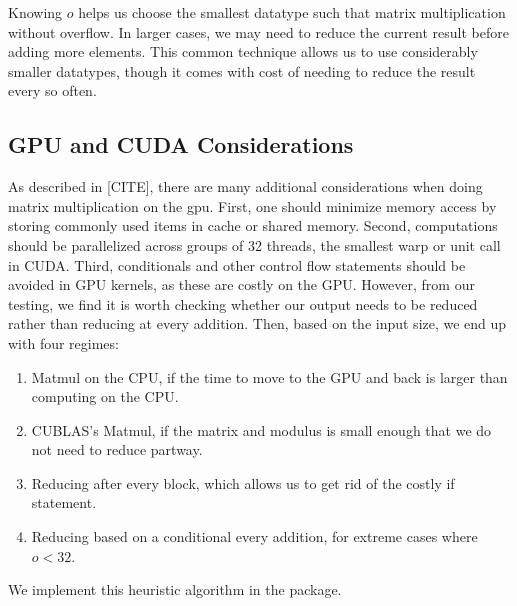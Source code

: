 Knowing $o$ helps us choose the smallest datatype such that matrix multiplication without overflow. In larger cases, we may need to reduce the current result before adding more elements. This common technique allows us to use considerably smaller datatypes, though it comes with cost of needing to reduce the result every so often.

\subsection{GPU and CUDA Considerations}

As described in [CITE], there are many additional considerations when doing matrix multiplication on the gpu. First, one should minimize memory access by storing commonly used items in cache or shared memory. Second, computations should be parallelized across groups of 32 threads, the smallest warp or unit call in CUDA. Third, conditionals and other control flow statements should be avoided in GPU kernels, as these are costly on the GPU. However, from our testing, we find it is worth checking whether our output needs to be reduced rather than reducing at every addition. Then, based on the input size, we end up with four regimes:
\begin{enumerate}
    \item Matmul on the CPU, if the time to move to the GPU and back is larger than computing on the CPU.
    \item CUBLAS's Matmul, if the matrix and modulus is small enough that we do not need to reduce partway.
    \item Reducing after every block, which allows us to get rid of the costly if statement.
    \item Reducing based on a conditional every addition, for extreme cases where $o < 32$.
\end{enumerate}
We implement this heuristic algorithm in the package.



